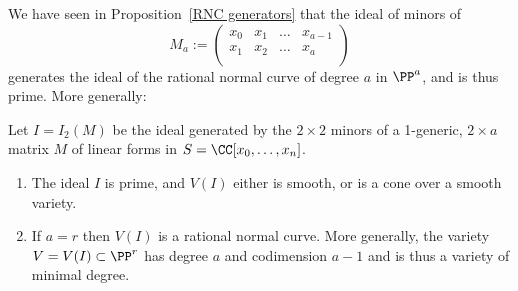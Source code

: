 We have seen in Proposition~\ref{RNC generators} that the ideal of minors of
$$
M_{a}:= 
\begin{pmatrix}
 x_0&x_1&\dots&x_{a-1}\\
 x_1&x_2&\dots&x_{a}\\
\end{pmatrix}
$$ 
generates the ideal of the rational normal curve of degree $a$ in $\PP^a$, and is thus prime. More generally:

\begin{theorem}\label{1-generic basics}  
Let $I = I_2(M)$  be the ideal generated by the $2\times 2$ minors of  a 1-generic, $2\times a$ matrix $M$
of linear forms in $S = \CC[x_0,\dots, x_n]$.
 \begin{enumerate}

\item The ideal $I$ is prime, and $V(I)$ either is smooth, or is a cone over a smooth variety.

\item If $a=r$ then $V(I)$ is a rational normal curve. More generally, the variety $V = V(I) \subset \PP^r$ has degree $a$ and codimension $a-1$ and is thus a variety of minimal degree.
\end{enumerate}
\end{theorem}

